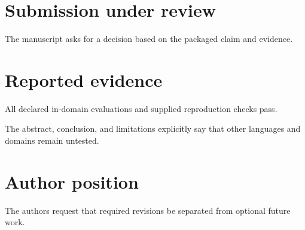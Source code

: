 \documentclass{article}
\begin{document}
\section{Submission under review}
The manuscript asks for a decision based on the packaged claim and evidence.
\section{Reported evidence}
All declared in-domain evaluations and supplied reproduction checks pass.

The abstract, conclusion, and limitations explicitly say that other languages and domains remain untested.
\section{Author position}
The authors request that required revisions be separated from optional future work.
\end{document}
